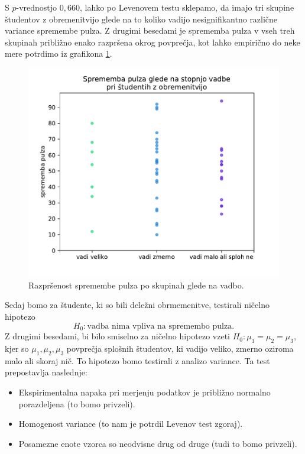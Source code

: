 \documentclass[a4paper,11pt]{article}
\begin{document}
S $p$-vrednostjo $0,660$, lahko po Levenovem testu sklepamo, da imajo tri skupine študentov z obremenitvijo glede na to koliko vadijo nesignifikantno različne variance spremembe pulza. Z drugimi besedami je sprememba pulza v vseh treh skupinah približno enako razpršena okrog povprečja, kot lahko empirično do neke mere potrdimo iz grafikona \ref{Razprsenost spremembe pulza po skupinah glede na vadbo}.

\begin{figure}[h]
    \begin{center}
        \includegraphics[scale=0.7]{varianca_vadba.pdf}
        \caption{
            Razpršenost spremembe pulza po skupinah glede na vadbo.
            }
        \label{Razprsenost spremembe pulza po skupinah glede na vadbo}
    \end{center}
\end{figure}


Sedaj bomo za študente, ki so bili deležni obrmemenitve, testirali ničelno hipotezo
\[
H_0: \text{vadba nima vpliva na spremembo pulza}.
\]
Z drugimi besedami, bi bilo smiselno za ničelno hipotezo vzeti $H_0 : \mu_1 = \mu_2 = \mu_3$, kjer so $\mu_1, \mu_2, \mu_3$ povprečja splošnih študentov, ki vadijo veliko, zmerno oziroma malo ali skoraj nič. To hipotezo bomo testirali z analizo variance. Ta test prepostavlja naslednje:
\begin{itemize}
    \item Ekspirimentalna napaka pri merjenju podatkov je približno normalno porazdeljena (to bomo privzeli).
    \item Homogenost variance (to nam je potrdil Levenov test zgoraj).
    \item Posamezne enote vzorca so neodvisne drug od druge (tudi to bomo privzeli).
\end{itemize}
\end{document}
